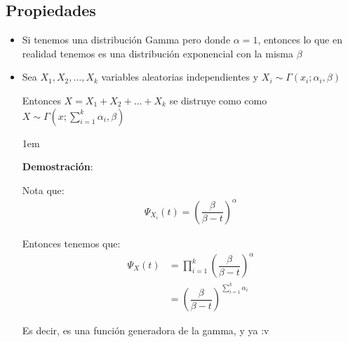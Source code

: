 \documentclass[12pt, fleqn]{report}                             %
\newenvironment{SmallIndentation}[1][0.75em]                    %
        {\begin{adjustwidth}{#1}{}\begin{footnotesize}}             %
        {\end{footnotesize}\end{adjustwidth}}                       %
\theoremstyle{break}                                            %
\newcommand{\Wrap}[1]           {\left( #1 \right)}             %
\begin{document}
            \subsection{Propiedades}

                \begin{itemize}

                    \item
                        Si tenemos una distribución Gamma pero donde $\alpha = 1$, entonces lo que
                        en realidad tenemos es una distribución exponencial con la misma $\beta$

                    \item 
                        Sea $X_1, X_2, \dots, X_k$ variables aleatorias independientes
                        y $X_i \sim \Gamma(x_i; \alpha_i, \beta)$ 

                        Entonces $X = X_1 + X_2 + \dots + X_k$ se distruye como
                        como $X \sim \Gamma(x; \sum_{i=1}^k \alpha_i, \beta)$

                        \begin{SmallIndentation}[1em]
                            \textbf{Demostración}:

                            Nota que:
                            \begin{align*}
                                \Psi_{X_i}(t) = \Wrap{\dfrac{\beta}{\beta - t}}^\alpha
                            \end{align*}

                            Entonces tenemos que:
                            \begin{align*}
                                \Psi_{X}(t) 
                                    &= \prod_{i=1}^k \Wrap{\dfrac{\beta}{\beta - t}}^\alpha      \\
                                    &= \Wrap{\dfrac{\beta}{\beta - t}}^{\sum_{i=1}^k \alpha_i }     
                            \end{align*}

                            Es decir, es una función generadora de la gamma, y ya :v
                        
                        \end{SmallIndentation}

                \end{itemize}
 
\end{document}
